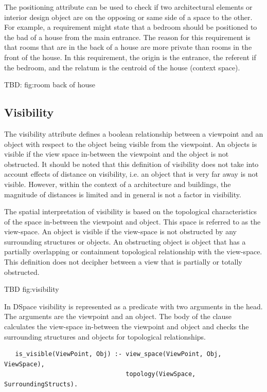 \documentclass[12pt]{ucthesis}
\begin{document}
The positioning attribute can be used to check if two architectural elements or interior design object are on the opposing or same side of a space to the other. For example, a requirement might state that a bedroom should be positioned to the bad of a house from the main entrance. The reason for this requirement is that rooms that are in the back of a house are more private than rooms in the front of the house. In this requirement, the origin is the entrance, the referent if the bedroom, and the relatum is the centroid of the house (context space).

TBD: fig:room back of house

\subsection{Visibility}
The visibility attribute defines a boolean relationship between a viewpoint and an object with respect to the object being visible from the viewpoint. An objects is visible if the view space in-between the viewpoint and the object is not obstructed. It should be noted that this definition of visibility does not take into account effects of distance on visibility, i.e. an object that is very far away is not visible. However, within the context of a architecture and buildings, the magnitude of distances is limited and in general is not a factor in visibility.

The spatial interpretation of visibility is based on the topological characteristics of the space in-between the viewpoint and object. This space is referred to as the view-space. An object is visible if the view-space is not obstructed by any surrounding structures or objects. An obstructing object is object that has a 
partially overlapping or containment topological relationship with the view-space. This definition does not decipher between a view that is partially or totally obstructed.

TBD fig:visibility

In DSpace visibility is represented as a predicate with two arguments in the head. The arguments are the viewpoint and an object. The body of the clause calculates the view-space in-between the viewpoint and object and checks the surrounding structures and objects for topological relationships.

\begin{verbatim}
   is_visible(ViewPoint, Obj) :- view_space(ViewPoint, Obj, ViewSpace),
                                 topology(ViewSpace, SurroundingStructs).
\end{verbatim}
\end{document}
